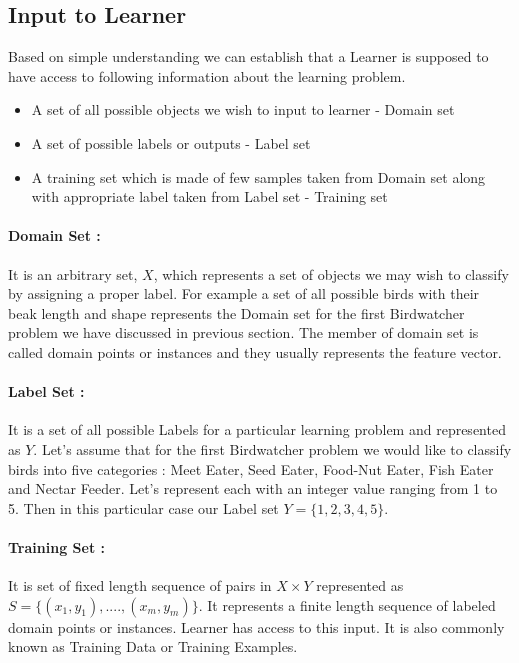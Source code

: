 \documentclass[a4paper]{article}
\begin{document}
\subsection{Input to Learner}
Based on simple understanding we can establish that a Learner is supposed to have access to following information about the learning problem. 

\begin{itemize}
\item A set of all possible objects we wish to input to learner - Domain set
\item A set of possible labels or outputs - Label set
\item A training set which is made of few samples taken from Domain set along with appropriate label taken from Label set - Training set
\end{itemize}

\paragraph{Domain Set :}  It is an arbitrary set, $X$, which represents a set of objects we may wish to classify by assigning a proper label. For example a set of all possible birds with their beak length and shape represents the Domain set for the first Birdwatcher problem we have discussed in previous section. The member of domain set is called domain points or instances and they usually represents the feature vector. 

\paragraph{Label Set :}  It is a set of all possible Labels for a particular learning problem and represented as $Y$. Let's assume that for the first Birdwatcher problem we would like to classify birds into five categories : Meet Eater, Seed Eater, Food-Nut Eater, Fish Eater and Nectar Feeder. Let's represent each with an integer value ranging from 1 to 5. Then in this particular case our Label set $Y = \{1, 2, 3, 4, 5\}$.

\paragraph{Training Set :} It is set of fixed length sequence of pairs in $X \times  Y$ represented as $S = \{(x_1, y_1), .... , (x_m, y_m)\}$. It represents a finite length sequence of labeled domain points or instances. Learner has access to this input. It is also commonly known as Training Data or Training Examples. 
\end{document}
